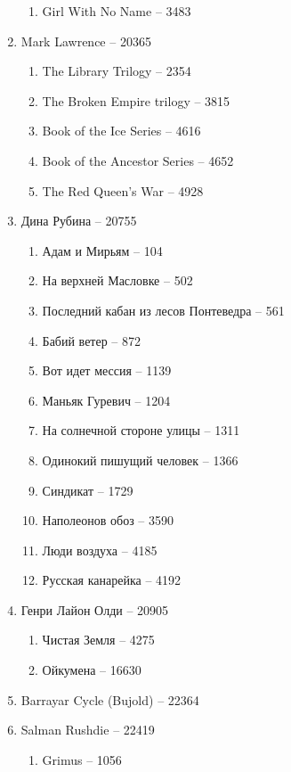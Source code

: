 \documentclass[a4paper, 11pt]{proc} %
\begin{document}
\begin{enumerate}
\begin{enumerate}
            \item Girl With No Name -- 3483
        \end{enumerate}
    \item Mark Lawrence -- 20365
        \begin{enumerate}
            \item The Library Trilogy -- 2354
            \item The Broken Empire trilogy -- 3815
            \item Book of the Ice Series -- 4616
            \item Book of the Ancestor Series -- 4652
            \item The Red Queen's War -- 4928
        \end{enumerate}
    \item Дина Рубина -- 20755
        \begin{enumerate}
            \item Адам и Мирьям -- 104
            \item На верхней Масловке -- 502
            \item Последний кабан из лесов Понтеведра -- 561
            \item Бабий ветер -- 872
            \item Вот идет мессия -- 1139
            \item Маньяк Гуревич -- 1204
            \item На солнечной стороне улицы -- 1311
            \item Одинокий пишущий человек -- 1366
            \item Синдикат -- 1729
            \item Наполеонов обоз -- 3590
            \item Люди воздуха -- 4185
            \item Русская канарейка -- 4192
        \end{enumerate}
    \item Генри Лайон Олди -- 20905
        \begin{enumerate}
            \item Чистая Земля -- 4275
            \item Ойкумена -- 16630
        \end{enumerate}
    \item Barrayar Cycle (Bujold) -- 22364
    \item Salman Rushdie -- 22419
        \begin{enumerate}
            \item Grimus -- 1056

\end{enumerate}
\end{enumerate}
\end{document}
